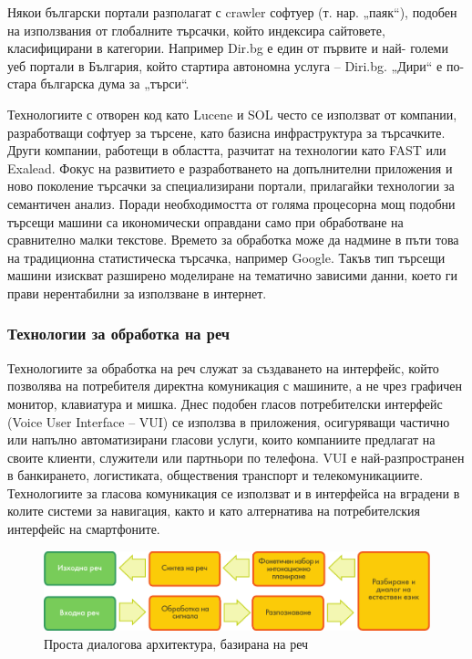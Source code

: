 \documentclass[]{../../metanetpaper}
\begin{document}
\begin{multicols}{2}
Някои български портали разполагат с crawler софтуер (т. нар.
 „паяк“), подобен на използвания от глобалните
 търсачки, който индексира сайтовете, класифицирани в
 категории. Например Dir.bg е един от първите и най-
големи уеб портали в България, който стартира
 автономна услуга – Diri.bg. „Дири“ е по-стара българска дума за „търси“. 

Технологиите с отворен код като
 Lucene и SOL често се използват от компании,
 разработващи софтуер за търсене, като базисна
 инфраструктура за търсачките. Други компании,
 работещи в областта, разчитат на технологии като FAST или Exalead.
Фокус на развитието е разработването на допълнителни приложения и ново поколение търсачки за специализирани портали, прилагайки технологии за семантичен анализ. Поради необходимостта от голяма процесорна мощ подобни търсещи машини са икономически оправдани само при обработване на сравнително малки текстове. Времето за обработка може да надмине в пъти това на традиционна статистическа търсачка, например Google. Такъв тип търсещи машини изискват разширено моделиране на тематично зависими данни, което ги прави нерентабилни за използване в интернет.

\subsubsection{Технологии за обработка на реч}

Технологиите за обработка на реч служат за създаването на интерфейс, който позволява на потребителя директна комуникация с машините, а не чрез графичен монитор, клавиатура и мишка. Днес подобен гласов
 потребителски интерфейс (Voice User Interface -- VUI) се използва в приложения, осигуряващи частично или напълно
 автоматизирани гласови услуги, които компаниите предлагат на своите клиенти, служители или партньори
 по телефона. VUI е най-разпространен в банкирането, логистиката,
 обществения транспорт и телекомуникациите.
 Технологиите за гласова комуникация се използват и в интерфейса на вградени в колите системи за навигация, както и като алтернатива на потребителския
 интерфейс на смартфоните.

\begin{figure}[htb]
  \center  \includegraphics[width=\textwidth]{../_media/bulgarian/simple_speech-based_dialogue_architecture}
  \center
  \caption{Проста диалогова архитектура, базирана на реч}
  \label{fig:dialoguearch_de}
\end{figure}


\end{multicols}
\end{document}
